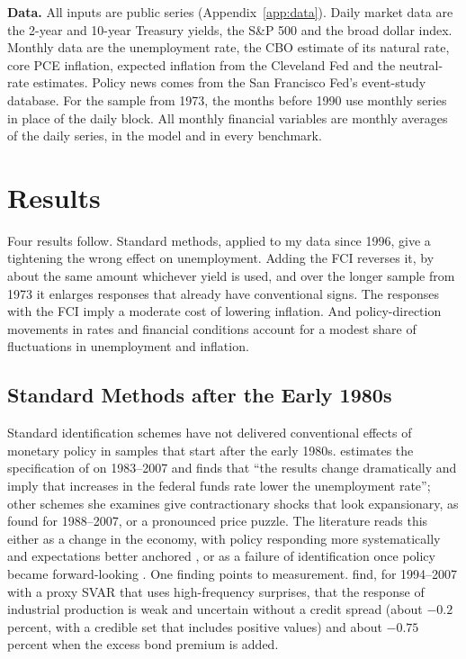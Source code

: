 \documentclass[11pt]{article}
\begin{document}
\textbf{Data.} All inputs are public series (Appendix~\ref{app:data}). Daily market data are the 2-year and 10-year Treasury yields, the S\&P 500 and the broad dollar index. Monthly data are the unemployment rate, the CBO estimate of its natural rate, core PCE inflation, expected inflation from the Cleveland Fed and the neutral-rate estimates. Policy news comes from the San Francisco Fed's event-study database. For the sample from 1973, the months before 1990 use monthly series in place of the daily block. All monthly financial variables are monthly averages of the daily series, in the model and in every benchmark.

\FloatBarrier
\section{Results}\label{sec:results}
Four results follow. Standard methods, applied to my data since 1996, give a tightening the wrong effect on unemployment. Adding the FCI reverses it, by about the same amount whichever yield is used, and over the longer sample from 1973 it enlarges responses that already have conventional signs. The responses with the FCI imply a moderate cost of lowering inflation. And policy-direction movements in rates and financial conditions account for a modest share of fluctuations in unemployment and inflation.

\subsection{Standard Methods after the Early 1980s}\label{sec:standard}
Standard identification schemes have not delivered conventional effects of monetary policy in samples that start after the early 1980s. \citet{ramey2016} estimates the specification of \citet{christiano1999} on 1983--2007 and finds that ``the results change dramatically and imply that increases in the federal funds rate lower the unemployment rate''; other schemes she examines give contractionary shocks that look expansionary, as \citet{barakchian2013} found for 1988--2007, or a pronounced price puzzle. The literature reads this either as a change in the economy, with policy responding more systematically and expectations better anchored \citep{boivin2006,boivin2010,primiceri2005}, or as a failure of identification once policy became forward-looking \citep{barakchian2013}. One finding points to measurement. \citet{caldara2019} find, for 1994--2007 with a proxy SVAR that uses high-frequency surprises, that the response of industrial production is weak and uncertain without a credit spread (about $-0.2$ percent, with a credible set that includes positive values) and about $-0.75$ percent when the excess bond premium is added.
\end{document}
